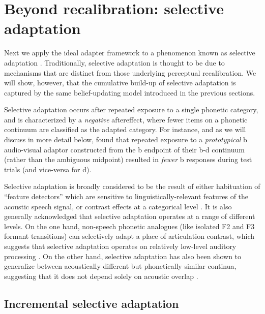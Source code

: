 \section{Beyond recalibration: selective adaptation}
\label{sec:selective-adapt}


Next we apply the ideal adapter framework to a phenomenon known as selective adaptation \cite{Eimas1973,Samuel1986}.  Traditionally, selective adaptation is thought to be due to mechanisms that are distinct from those underlying perceptual recalibration.  We will show, however, that the cumulative build-up of selective adaptation is captured by the same belief-updating model introduced in the previous sections.

Selective adaptation occurs after repeated exposure to a single phonetic category, and is characterized by a \emph{negative} aftereffect, where fewer items on a phonetic continuum are classified as the adapted category.  For instance, and as we will discuss in more detail below,  found that repeated exposure to a \emph{prototypical} \ph b audio-visual adaptor constructed from the \ph b endpoint of their \ph b-\ph d continuum (rather than the ambiguous midpoint) resulted in \emph{fewer} \ph b responses during test trials (and vice-versa for \ph d).

Selective adaptation is broadly considered to be the result of either habituation of ``feature detectors'' which are sensitive to linguistically-relevant features of the acoustic speech signal, or contrast effects at a categorical level \cite{Samuel1986}.  It is also generally acknowledged that selective adaptation operates at a range of different levels.  On the one hand, non-speech phonetic analogues (like isolated F2 and F3 formant transitions) can selectively adapt a place of articulation contrast, which suggests that selective adaptation operates on relatively low-level auditory processing \cite{Samuel1996}. On the other hand, selective adaptation has also been shown to generalize between acoustically different but phonetically similar continua, suggesting that it does not depend solely on acoustic overlap \cite{Samuel1996,Sawusch1977}.

\subsection{Incremental selective adaptation}
\label{sec:incr-select-adapt}

